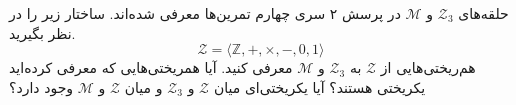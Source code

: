 حلقه‌های 
$\mathcal{Z}_{3}$
و
$\mathcal{M}$
در پرسش ۲ سری چهارم تمرین‌ها معرفی شده‌اند. ساختار زیر را در نظر بگیرید.
\[ \mathcal{Z} = \langle \mathbb{Z},+,\times,-,0,1 \rangle \]
هم‌ریختی‌هایی از 
$\mathcal{Z}$
به 
$\mathcal{Z}_{3}$
و
$\mathcal{M}$
معرفی کنید. آیا همریختی‌هایی که معرفی کرده‌اید یکریختی هستند؟ آیا یکریختی‌ای میان 
$\mathcal{Z}$
و
$\mathcal{Z}_{3}$
و میان
$\mathcal{Z}$
و
$\mathcal{M}$
وجود دارد؟